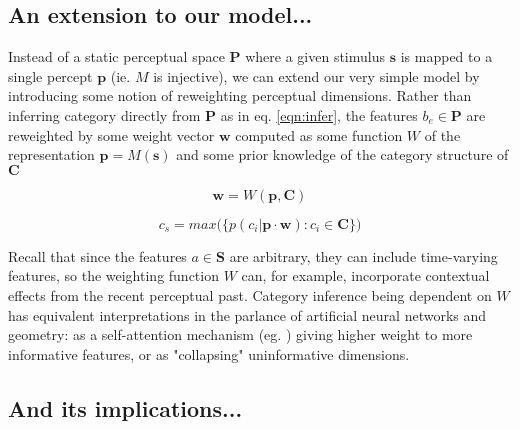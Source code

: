 \begin{multicols}{2}


\subsection{An extension to our model...}

Instead of a static perceptual space $\mathbf{P}$ where a given stimulus $\mathbf{s}$ is mapped to a single percept $\mathbf{p}$ (ie. $M$ is injective), we can extend our very simple model by introducing some notion of reweighting perceptual dimensions. Rather than inferring category directly from $\mathbf{P}$ as in eq. \ref{eqn:infer}, the features $b_e \in \mathbf{P}$ are reweighted by some weight vector $\mathbf{w}$ computed as some function $W$ of the representation $\mathbf{p} = M(\mathbf{s})$ and some prior knowledge of the category structure of $\mathbf{C}$

\begin{equation}
\label{eqn:w}
\mathbf{w} = W(\mathbf{p}, \mathbf{C})
\end{equation}

\begin{equation}
\label{eqn:infer_2}
c_s = max\big( \big\{ p(c_i | \mathbf{p} \cdot \mathbf{w}) : c_i \in \mathbf{C} \big\}\big)
\end{equation}

Recall that since the features $a \in \mathbf{S}$ are arbitrary, they can include time-varying features, so the weighting function $W$ can, for example, incorporate contextual effects from the recent perceptual past. Category inference being dependent on $W$ has equivalent interpretations in the parlance of artificial neural networks and geometry: as a self-attention mechanism (eg. \cite{vaswaniAttentionAllYou2017}) giving higher weight to more informative features, or as "collapsing" uninformative dimensions. 

\subsection{And its implications...}



\end{multicols}
